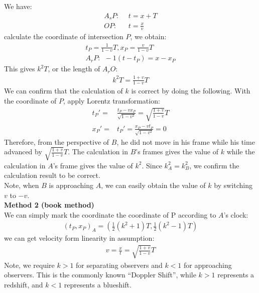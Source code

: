 \documentclass[9pt,oneside,headheight=10mm]{book}
\newcommand{\cb}[1]{\left(#1\right)}
\newcommand{\blue}{\color{blue}}
\newcommand{\black}{\color{black}}
\newcommand{\bluebf}[1]{\textbf{\blue #1\black}}
\begin{document}
\begin{multicols}{2}
	We have:
	\begin{align*}
	A_sP:~~&t = x+T\\
	OP:~~	&t = \frac{x}{v}
	\end{align*}
	calculate the coordinate of intersection $P$, we obtain:
	\begin{align*}
	t_P = \frac{1}{1-v}T, x_P = \frac{v}{1-v}T\\
	A_rP:~~ -1(t - t_P) = x - x_P
	\end{align*}
	This gives $k^2T$, or the length of $A_rO$:
	\begin{align*}
	k^2T = \frac{1+v}{1-v}T
	\end{align*}
	We can confirm that the calculation of $k$ is correct by doing the following. With the coordinate of $P$, apply Lorentz transformation:
	\begin{align*}
	t_P' =& \frac{t_P - vx_P}{\sqrt{1 - v^2}} = \sqrt{\frac{1+v}{1-v}}T\\
	x_P' =& t_P' = \frac{x_P - vt_P}{\sqrt{1 - v^2}} = 0	
	\end{align*}
	Therefore, from the perspective of $B$, he did not move in his frame while his time advanced by $\sqrt{\frac{1+v}{1-v}}T$. The calculation in $B$'s frames gives the value of $k$ while the calculation in $A$'s frame gives the value of $k^2$. Since $k_A^2 = k_B^2$, we confirm the calculation result to be correct. \\
	Note, when $B$ is approaching $A$, we can easily obtain the value of $k$ by switching $v$ to $-v$.\\

	\bluebf{Method 2 (book method)}\\
	
	We can simply mark the coordinate the coordinate of P according to $A$'s clock:
	\begin{align*}
	(t_P, x_P)_A = \cb{\frac{1}{2}(k^2+1)T, \frac{1}{2}(k^2-1)T}
	\end{align*}
	we can get velocity form linearity in assumption:
	\begin{align*}
	v = \frac{x}{t} = \sqrt{\frac{1+v}{1-v}}T
	\end{align*}
	Note, we require $k>1$ for separating observers and $k<1$ for approaching observers. This is the commonly known ``Doppler Shift'', while $k>1$ represents a \color{red}redshift\black, and $k<1$ represents a \blue blueshift\black.
	\end{multicols}

	\newpage
\end{document}
